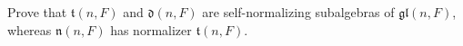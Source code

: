 Prove that $\mathfrak{t}(n, F)$ and $\mathfrak{d}(n, F)$ are self-normalizing subalgebras of $\mathfrak{gl}(n, F)$, whereas $\mathfrak{n}(n, F)$ has normalizer $\mathfrak{t}(n, F)$.

